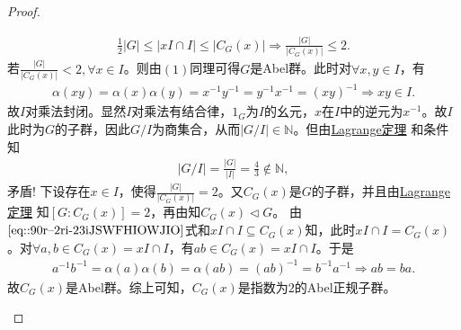 \documentclass[../../main.tex]{subfiles}%
\begin{document}
\begin{proof}
\begin{enumerate}[(1)]
\begin{align}
\frac{1}{2}|G|\leqslant |xI\cap I|\leqslant |C_G(x)|\Longrightarrow \frac{|G|}{|C_G(x)|}\leqslant 2.
\label{eq::90r--2ri-23iJSWFHIOWJIO}
\end{align}
若$\frac{|G|}{|C_G(x)|}<2,\forall x\in I$。则由$(1)$同理可得$G$是Abel群。此时对$\forall x,y\in I$，有
\begin{align*}
\alpha(xy)=\alpha(x)\alpha(y)=x^{-1}y^{-1}=y^{-1}x^{-1}=(xy)^{-1}\Longrightarrow xy\in I.
\end{align*}
故$I$对乘法封闭。显然$I$对乘法有结合律，$1_G$为$I$的幺元，$x$在$I$中的逆元为$x^{-1}$。故$I$此时为$G$的子群，因此$G/I$为商集合，从而$|G/I|\in \mathbb{N}$。但由\hyperref[theorem:抽象代数--Lagrange定理]{Lagrange定理}
和条件知
\begin{align*}
|G/I|=\frac{|G|}{|I|}=\frac{4}{3}\notin \mathbb{N},
\end{align*}
矛盾!
下设存在$x\in I$，使得$\frac{|G|}{|C_G(x)|}=2$。又$C_G(x)$是$G$的子群，并且由\hyperref[theorem:抽象代数--Lagrange定理]{Lagrange定理}
知$[G:C_G(x)] = 2$，再由知$C_G(x)\lhd G$。
由$\eqref{eq::90r--2ri-23iJSWFHIOWJIO}$式和$xI\cap I\subseteq C_G(x)$知，此时$xI\cap I=C_G(x)$。对$\forall a,b\in C_G(x)=xI\cap I$，有$ab\in C_G(x)=xI\cap I$。于是
\begin{align*}
a^{-1}b^{-1}=\alpha(a)\alpha(b)=\alpha(ab)=(ab)^{-1}=b^{-1}a^{-1}\Longrightarrow ab=ba.
\end{align*}
故$C_G(x)$是Abel群。综上可知，$C_G(x)$是指数为$2$的Abel正规子群。
\end{enumerate}
\end{proof}
\end{document}
